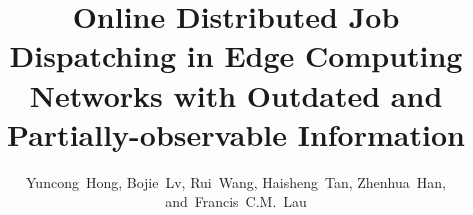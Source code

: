 \documentclass[10pt,conference]{IEEEtran} %
\theoremstyle{definition}             %
\theoremstyle{remark}                 %
\theoremstyle{plain}                  %
\begin{document}
    \title{
        Online Distributed Job Dispatching in Edge Computing Networks with Outdated and Partially-observable Information
    }

    \author{
        Yuncong~Hong,%
        Bojie~Lv,%
        Rui~Wang,%
        Haisheng~Tan,%
        Zhenhua~Han,%
        and~Francis~C.M.~Lau%
    }%


    \maketitle
    
        
    

    
    

    
    
    
\end{document}
